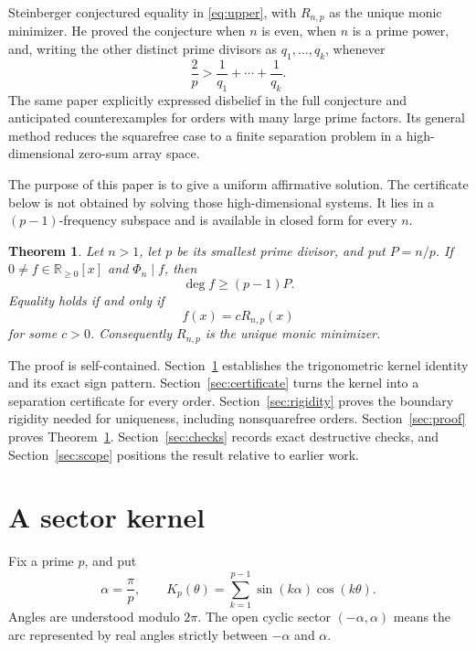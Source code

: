 \documentclass[11pt]{article}
\newtheorem{theorem}{Theorem}[section]
\numberwithin{equation}{section}
\begin{document}
Steinberger \cite[Conjecture~1]{steinberger2012} conjectured equality in
\eqref{eq:upper}, with $R_{n,p}$ as the unique monic minimizer. He proved the
conjecture when $n$ is even, when $n$ is a prime power, and, writing the other
distinct prime divisors as $q_1,\ldots,q_k$, whenever
\begin{equation}
\frac2p>\frac1{q_1}+\cdots+\frac1{q_k}.
\label{eq:reciprocal}
\end{equation}
The same paper explicitly expressed disbelief in the full conjecture and
anticipated counterexamples for orders with many large prime factors. Its
general method reduces the squarefree case to a finite separation problem in a
high-dimensional zero-sum array space.

The purpose of this paper is to give a uniform affirmative solution. The
certificate below is not obtained by solving those high-dimensional systems.
It lies in a $(p-1)$-frequency subspace and is available in closed form for
every $n$.

\Needspace{0.24\textheight}
\begin{theorem}\label{thm:main}
Let $n>1$, let $p$ be its smallest prime divisor, and put $P=n/p$. If
$0\ne f\in\mathbb R_{\geq0}[x]$ and $\Phi_n\mid f$, then
\begin{equation}
\deg f\geq(p-1)P.
\label{eq:lower}
\end{equation}
Equality holds if and only if
\begin{equation}
f(x)=cR_{n,p}(x)
\label{eq:equality}
\end{equation}
for some $c>0$. Consequently $R_{n,p}$ is the unique monic minimizer.
\end{theorem}

The proof is self-contained. Section~\ref{sec:kernel} establishes the
trigonometric kernel identity and its exact sign pattern.
Section~\ref{sec:certificate} turns the kernel into a separation certificate
for every order. Section~\ref{sec:rigidity} proves the boundary rigidity needed
for uniqueness, including nonsquarefree orders. Section~\ref{sec:proof} proves
Theorem~\ref{thm:main}. Section~\ref{sec:checks} records exact destructive
checks, and Section~\ref{sec:scope} positions the result relative to earlier
work.

\section{A sector kernel}\label{sec:kernel}

Fix a prime $p$, and put
\begin{equation}
\alpha=\frac\pi p,
\qquad
K_p(\theta)=\sum_{k=1}^{p-1}\sin(k\alpha)\cos(k\theta).
\label{eq:kernel}
\end{equation}
Angles are understood modulo $2\pi$. The open cyclic sector
$(-\alpha,\alpha)$ means the arc represented by real angles strictly between
$-\alpha$ and $\alpha$.
\end{document}
